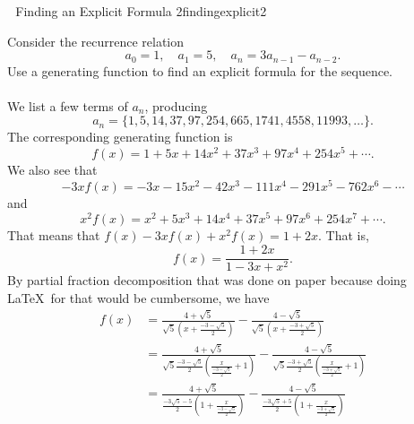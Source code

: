         \begin{exercise}{\Difficulty\,\Difficulty\,\Difficulty\,\,Finding an Explicit Formula 2}{findingexplicit2}
        
            Consider the recurrence relation
            \begin{equation*}
                a_0=1,\quad a_1=5,\quad a_n=3a_{n-1}-a_{n-2}.
            \end{equation*}
            Use a generating function to find an explicit formula for the sequence.
            \\
            \\
            We list a few terms of \(a_n\), producing
            \begin{equation*}
                a_n=\{1,5,14,37,97,254,665,1741,4558,11993,\ldots\}.
            \end{equation*}
            The corresponding generating function is
            \begin{equation*}
                f(x)=1+5x+14x^2+37x^3+97x^4+254x^5+\cdots.
            \end{equation*}
            We also see that
            \begin{equation*}
                -3xf(x)=-3x-15x^2-42x^3-111x^4-291x^5-762x^6-\cdots
            \end{equation*}
            and
            \begin{equation*}
                x^2f(x)=x^2+5x^3+14x^4+37x^5+97x^6+254x^7+\cdots.
            \end{equation*}
            That means that \(f(x)-3xf(x)+x^2f(x)=1+2x\). That is,
            \begin{equation*}
                f(x)=\frac{1+2x}{1-3x+x^2}.
            \end{equation*}
            By partial fraction decomposition that was done on paper because doing \LaTeX\ for that would be cumbersome, we have
            \begin{align*}
                f(x)&=\frac{4+\sqrt{5}}{\sqrt{5}\left(x+\frac{-3-\sqrt{5}}{2}\right)}-\frac{4-\sqrt{5}}{\sqrt{5}\left(x+\frac{-3+\sqrt{5}}{2}\right)} \\
                &=\frac{4+\sqrt{5}}{\sqrt{5}\frac{-3-\sqrt{5}}{2}\left(\frac{x}{\frac{-3-\sqrt{5}}{2}}+1\right)}-\frac{4-\sqrt{5}}{\sqrt{5}\frac{-3+\sqrt{5}}{2}\left(\frac{x}{\frac{-3+\sqrt{5}}{2}}+1\right)} \\
                &=\frac{4+\sqrt{5}}{\frac{-3\sqrt{5}-5}{2}\left(1+\frac{x}{\frac{-3-\sqrt{5}}{2}}\right)}-\frac{4-\sqrt{5}}{\frac{-3\sqrt{5}+5}{2}\left(1+\frac{x}{\frac{-3+\sqrt{5}}{2}}\right)} \\ 

\end{align*}
\end{exercise}
